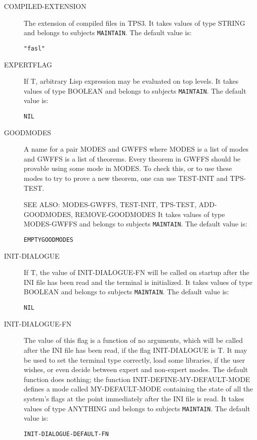 \begin{description} 
\item[COMPILED-EXTENSION]  
The extension of compiled files in TPS3.
It takes values of type STRING and belongs to subjects \texttt{MAINTAIN}.  The default value is: \begin{lstlisting}
"fasl"
\end{lstlisting}

\item[EXPERTFLAG]  
If T, arbitrary Lisp expression may be evaluated on top levels.
It takes values of type BOOLEAN and belongs to subjects \texttt{MAINTAIN}.  The default value is: \begin{lstlisting}
NIL
\end{lstlisting}

\item[GOODMODES]  
A name for a pair MODES and GWFFS where MODES is a list of modes
and GWFFS is a list of theorems.  Every theorem in GWFFS should be 
provable using some mode in MODES.  To check this, or to use these modes
to try to prove a new theorem, one can use TEST-INIT and TPS-TEST.

SEE ALSO: MODES-GWFFS, TEST-INIT, TPS-TEST, ADD-GOODMODES, REMOVE-GOODMODES
It takes values of type MODES-GWFFS and belongs to subjects \texttt{MAINTAIN}.  The default value is: \begin{lstlisting}
EMPTYGOODMODES
\end{lstlisting}

\item[INIT-DIALOGUE]  
If T, the value of INIT-DIALOGUE-FN will be called on startup
after the INI file has been read and the terminal is initialized.
It takes values of type BOOLEAN and belongs to subjects \texttt{MAINTAIN}.  The default value is: \begin{lstlisting}
NIL
\end{lstlisting}

\item[INIT-DIALOGUE-FN]  
The value of this flag is a function of no arguments,
which will be called after the INI file has been read, if
the flag INIT-DIALOGUE is T.  It may be used to set the terminal type
correctly, load some libraries, if the user wishes, or even decide
between expert and non-expert modes. The default function does nothing;
the function INIT-DEFINE-MY-DEFAULT-MODE defines a mode called
MY-DEFAULT-MODE containing the state of all the system's flags at 
the point immediately after the INI file is read.
It takes values of type ANYTHING and belongs to subjects \texttt{MAINTAIN}.  The default value is: \begin{lstlisting}
INIT-DIALOGUE-DEFAULT-FN
\end{lstlisting}


\end{description}
